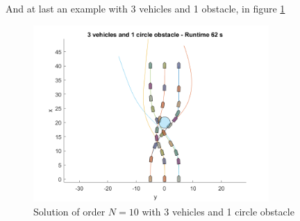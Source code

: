 \par And at last an example with 3 vehicles and 1 obstacle, in figure \ref{fig:finalexample}

\begin{figure}[h!]
\centering
\includegraphics[width=0.8\textwidth]{Images/results/finalexample.png}
\caption{Solution of order $N=10$ with 3 vehicles and 1 circle obstacle}
\label{fig:finalexample}
\end{figure}
